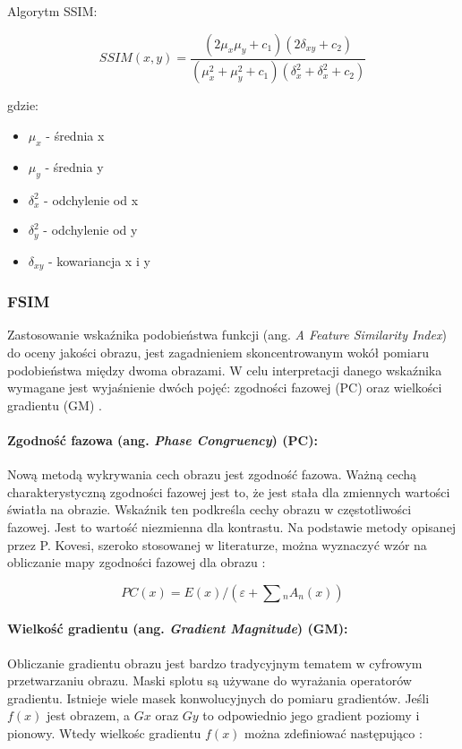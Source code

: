 \documentclass{article}
\begin{document}
Algorytm SSIM:

\begin{equation}
SSIM(x, y) = \frac{(2\mu_{x}\mu_{y} + c_{1}) (2\delta_{xy} + c_2)}{(\mu_{x}^2 + \mu_{y}^2 + c_{1}) (\delta_{x}^2 + \delta_{x}^2 + c_2)}
\end{equation}

gdzie:
\begin{itemize}[label=]
    \item $\mu_{x}$ - średnia x
    \item $\mu_{y}$ - średnia y
    \item $\delta_{x}^2$ - odchylenie od x
    \item $\delta_{y}^2$ - odchylenie od y
    \item $\delta_{xy}$ - kowariancja x i y
\end{itemize}

\subsubsection{FSIM}

Zastosowanie wskaźnika podobieństwa funkcji (ang. \emph{A Feature Similarity Index}) do oceny jakości obrazu, 
jest zagadnieniem skoncentrowanym wokół pomiaru podobieństwa między dwoma obrazami.
W celu interpretacji danego wskaźnika wymagane jest wyjaśnienie dwóch pojęć: zgodności fazowej (PC) oraz wielkości gradientu (GM) \cite{fsim_theory}.

\paragraph{Zgodność fazowa (ang. \emph{Phase Congruency}) (PC):}
Nową metodą wykrywania cech obrazu jest zgodność fazowa. Ważną cechą charakterystyczną zgodności fazowej jest to,
że jest stała dla zmiennych wartości światła na obrazie. Wskaźnik ten podkreśla cechy obrazu w częstotliwości fazowej. 
Jest to wartość niezmienna dla kontrastu. Na podstawie metody opisanej przez P. Kovesi, szeroko stosowanej w literaturze, 
można wyznaczyć wzór na obliczanie mapy zgodności fazowej dla obrazu \cite{pc}:

\begin{equation}
PC(x) = E(x) / (\varepsilon + \sum\limits{_{n}} A_n(x))
\end{equation}

\paragraph{Wielkość gradientu  (ang. \emph{Gradient Magnitude}) (GM):}
Obliczanie gradientu obrazu jest bardzo tradycyjnym tematem w cyfrowym przetwarzaniu obrazu. 
Maski splotu są używane do wyrażania operatorów gradientu. Istnieje wiele masek konwolucyjnych do pomiaru gradientów. 
Jeśli $f(x)$ jest obrazem, a $Gx$ oraz $Gy$ to odpowiednio jego gradient poziomy i pionowy. 
Wtedy wielkośc gradientu $f(x)$ można zdefiniować następująco \cite{gm}:
\end{document}
